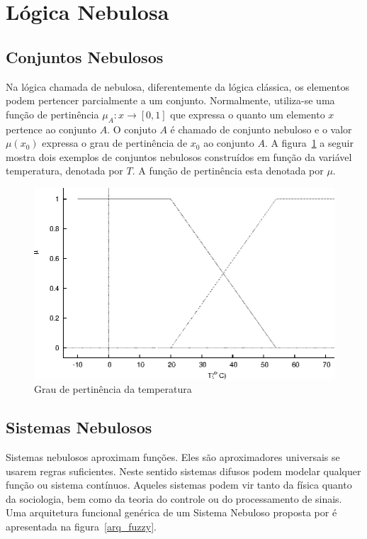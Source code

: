 \section{Lógica Nebulosa}

\subsection{Conjuntos Nebulosos}

Na lógica chamada de nebulosa, diferentemente da lógica clássica, os elementos
podem pertencer parcialmente a um conjunto. Normalmente, utiliza-se uma função
de pertinência $\mu_A : x \rightarrow [0,1]$ que expressa o quanto um elemento
$x$ pertence ao conjunto $A$. O conjuto $A$ é chamado de conjunto nebuloso e o
valor $\mu(x_0)$ expressa o grau de pertinência de $x_0$ ao conjunto $A$. A
figura~\ref{conj_fuzzy} a seguir mostra dois exemplos de conjuntos nebulosos
construídos em função da variável temperatura, denotada por $T$. A função de
pertinência esta denotada por $\mu$.

\begin{figure}
  \includegraphics[width=14cm]{imgs/fuzzy_graphic/fuzzy_graphic.eps}
  \caption{Grau de pertinência da temperatura}
  \label{conj_fuzzy}
\end{figure}

\subsection{Sistemas Nebulosos}

Sistemas nebulosos aproximam funções. Eles são aproximadores universais se
usarem regras suficientes. Neste sentido sistemas difusos podem modelar
qualquer função ou sistema contínuos. Aqueles sistemas podem vir tanto da física
quanto da sociologia, bem como da teoria do controle ou do processamento de
sinais. Uma arquitetura funcional genérica de um Sistema Nebuloso proposta por
\cite{passos2005datamining} é apresentada na figura~\ref{arq_fuzzy}.

